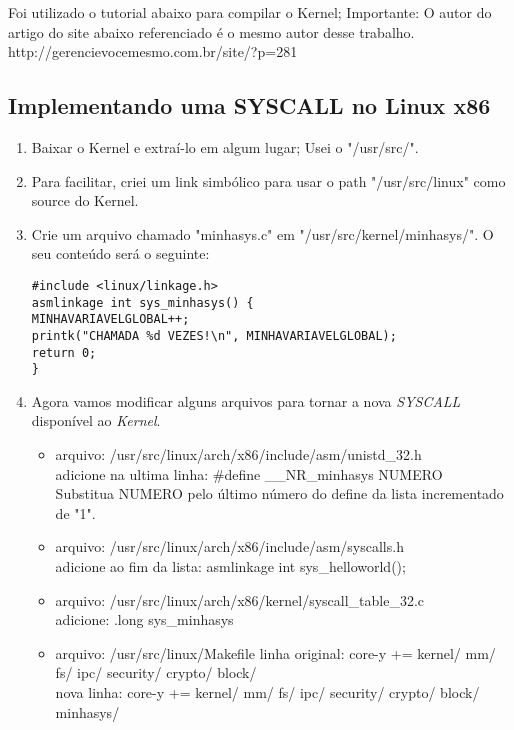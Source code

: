 \documentclass[12pt]{article}
\begin{document}
Foi utilizado o tutorial abaixo para compilar o Kernel; Importante: O autor do
artigo do site abaixo referenciado é o mesmo autor desse trabalho.
http://gerencievocemesmo.com.br/site/?p=281

\subsection{Implementando uma SYSCALL no Linux x86}

\begin{enumerate}

\item Baixar o Kernel e extraí-lo em algum lugar; Usei o "/usr/src/".

\item Para facilitar, criei um link simbólico para usar o path "/usr/src/linux"
como source do Kernel.

\item Crie um arquivo chamado "minhasys.c" em "/usr/src/kernel/minhasys/". O seu conteúdo
será o seguinte:

\begin{lstlisting}
#include <linux/linkage.h>
asmlinkage int sys_minhasys() {
MINHAVARIAVELGLOBAL++;
printk("CHAMADA %d VEZES!\n", MINHAVARIAVELGLOBAL);
return 0;
}
\end{lstlisting}

\item Agora vamos modificar alguns arquivos para tornar a nova \textit{SYSCALL}
disponível ao \textit{Kernel}.

\begin{itemize}
\item arquivo: /usr/src/linux/arch/x86/include/asm/unistd\_32.h \\
adicione na ultima linha: \#define \_\_NR\_minhasys         NUMERO\\
Substitua NUMERO pelo último número do define da lista incrementado de "1".

\item arquivo: /usr/src/linux/arch/x86/include/asm/syscalls.h\\
adicione ao fim da lista: asmlinkage int sys\_helloworld();

\item arquivo: /usr/src/linux/arch/x86/kernel/syscall\_table\_32.c\\
adicione: .long sys\_minhasys

\item arquivo: /usr/src/linux/Makefile
linha original: core-y += kernel/ mm/ fs/ ipc/ security/ crypto/ block/\\
nova linha: core-y += kernel/ mm/ fs/ ipc/ security/ crypto/ block/ minhasys/


\end{itemize}
\end{enumerate}
\end{document}
